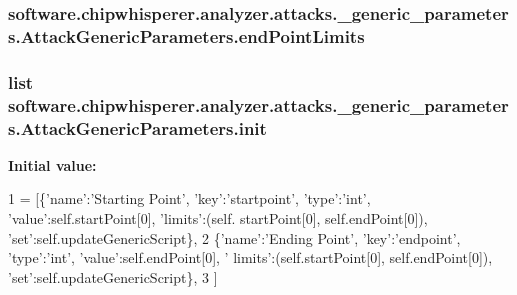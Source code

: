 \subsubsection[{end\+Point\+Limits}]{\setlength{\rightskip}{0pt plus 5cm}software.\+chipwhisperer.\+analyzer.\+attacks.\+\_\+generic\+\_\+parameters.\+Attack\+Generic\+Parameters.\+end\+Point\+Limits}\label{classsoftware_1_1chipwhisperer_1_1analyzer_1_1attacks_1_1__generic__parameters_1_1AttackGenericParameters_a404675ed60d616274649573aec1ca5e3}
\hypertarget{classsoftware_1_1chipwhisperer_1_1analyzer_1_1attacks_1_1__generic__parameters_1_1AttackGenericParameters_a17c07a8794f606bb50b9211c5c649390}{}
\subsubsection[{init}]{\setlength{\rightskip}{0pt plus 5cm}list software.\+chipwhisperer.\+analyzer.\+attacks.\+\_\+generic\+\_\+parameters.\+Attack\+Generic\+Parameters.\+init\hspace{0.3cm}{\ttfamily [static]}}\label{classsoftware_1_1chipwhisperer_1_1analyzer_1_1attacks_1_1__generic__parameters_1_1AttackGenericParameters_a17c07a8794f606bb50b9211c5c649390}
{\bfseries Initial value\+:}
\begin{DoxyCode}
1 = [\{\textcolor{stringliteral}{'name'}:\textcolor{stringliteral}{'Starting Point'}, \textcolor{stringliteral}{'key'}:\textcolor{stringliteral}{'startpoint'}, \textcolor{stringliteral}{'type'}:\textcolor{stringliteral}{'int'}, \textcolor{stringliteral}{'value'}:self.startPoint[0], \textcolor{stringliteral}{'limits'}:(self.
      startPoint[0], self.endPoint[0]), \textcolor{stringliteral}{'set'}:self.updateGenericScript\},
2                     \{\textcolor{stringliteral}{'name'}:\textcolor{stringliteral}{'Ending Point'}, \textcolor{stringliteral}{'key'}:\textcolor{stringliteral}{'endpoint'}, \textcolor{stringliteral}{'type'}:\textcolor{stringliteral}{'int'}, \textcolor{stringliteral}{'value'}:self.endPoint[0], \textcolor{stringliteral}{'
      limits'}:(self.startPoint[0], self.endPoint[0]), \textcolor{stringliteral}{'set'}:self.updateGenericScript\},
3                     ]
\end{DoxyCode}



